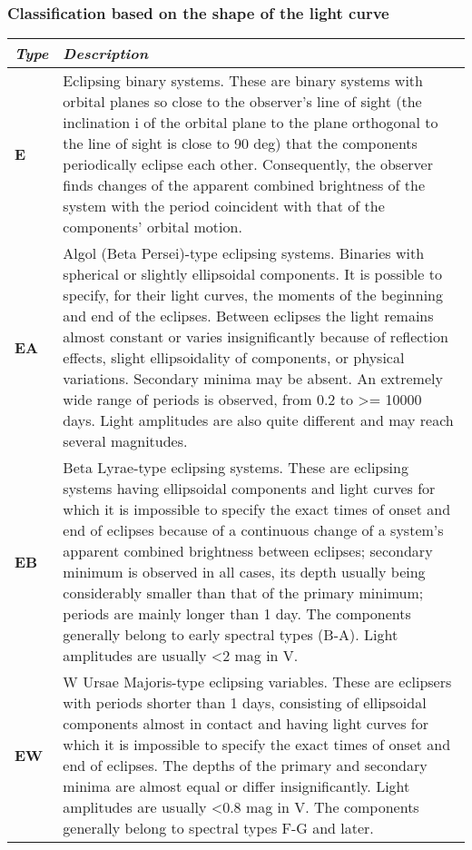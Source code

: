 \subsubsection{Classification based on the shape of the light
curve}\label{classification-based-on-the-shape-of-the-light-curve}

\begin{longtabu} to \textwidth {l|X}
\toprule
\emph{Type} & \emph{Description}\tabularnewline
\midrule
\textbf{E} & Eclipsing binary systems. These are binary systems with
orbital planes so close to the observer's line of sight (the inclination
i of the orbital plane to the plane orthogonal to the line of sight is
close to 90 deg) that the components periodically eclipse each other.
Consequently, the observer finds changes of the apparent combined
brightness of the system with the period coincident with that of the
components' orbital motion.\tabularnewline
\midrule
\textbf{EA} & Algol (Beta Persei)-type eclipsing systems. Binaries with
spherical or slightly ellipsoidal components. It is possible to specify,
for their light curves, the moments of the beginning and end of the
eclipses. Between eclipses the light remains almost constant or varies
insignificantly because of reflection effects, slight ellipsoidality of
components, or physical variations. Secondary minima may be absent. An
extremely wide range of periods is observed, from 0.2 to \textgreater{}=
10000 days. Light amplitudes are also quite different and may reach
several magnitudes.\tabularnewline
\midrule
\textbf{EB} & Beta Lyrae-type eclipsing systems. These are eclipsing
systems having ellipsoidal components and light curves for which it is
impossible to specify the exact times of onset and end of eclipses
because of a continuous change of a system's apparent combined
brightness between eclipses; secondary minimum is observed in all cases,
its depth usually being considerably smaller than that of the primary
minimum; periods are mainly longer than 1 day. The components generally
belong to early spectral types (B-A). Light amplitudes are usually
\textless{}2 mag in V.\tabularnewline
\midrule
\textbf{EW} & W Ursae Majoris-type eclipsing variables. These are
eclipsers with periods shorter than 1 days, consisting of ellipsoidal
components almost in contact and having light curves for which it is
impossible to specify the exact times of onset and end of eclipses. The
depths of the primary and secondary minima are almost equal or differ
insignificantly. Light amplitudes are usually \textless{}0.8 mag in V.
The components generally belong to spectral types F-G and
later.\tabularnewline
\bottomrule
\end{longtabu}

